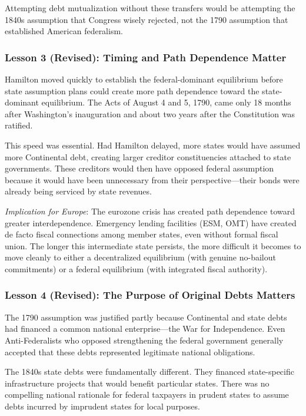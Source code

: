\documentclass[12pt]{article}
\begin{document}
Attempting debt mutualization without these transfers would be attempting the 1840s assumption that Congress wisely rejected, not the 1790 assumption that established American federalism.

\subsubsection{Lesson 3 (Revised): Timing and Path Dependence Matter}

Hamilton moved quickly to establish the federal-dominant equilibrium before state assumption plans could create more path dependence toward the state-dominant equilibrium. The Acts of August 4 and 5, 1790, came only 18 months after Washington's inauguration and about two years after the Constitution was ratified.

This speed was essential. Had Hamilton delayed, more states would have assumed more Continental debt, creating larger creditor constituencies attached to state governments. These creditors would then have opposed federal assumption because it would have been unnecessary from their perspective---their bonds were already being serviced by state revenues.

\textit{Implication for Europe}: The eurozone crisis has created path dependence toward greater interdependence. Emergency lending facilities (ESM, OMT) have created de facto fiscal connections among member states, even without formal fiscal union. The longer this intermediate state persists, the more difficult it becomes to move cleanly to either a decentralized equilibrium (with genuine no-bailout commitments) or a federal equilibrium (with integrated fiscal authority).

\subsubsection{Lesson 4 (Revised): The Purpose of Original Debts Matters}

The 1790 assumption was justified partly because Continental and state debts had financed a common national enterprise---the War for Independence. Even Anti-Federalists who opposed strengthening the federal government generally accepted that these debts represented legitimate national obligations.

The 1840s state debts were fundamentally different. They financed state-specific infrastructure projects that would benefit particular states. There was no compelling national rationale for federal taxpayers in prudent states to assume debts incurred by imprudent states for local purposes.
\end{document}
